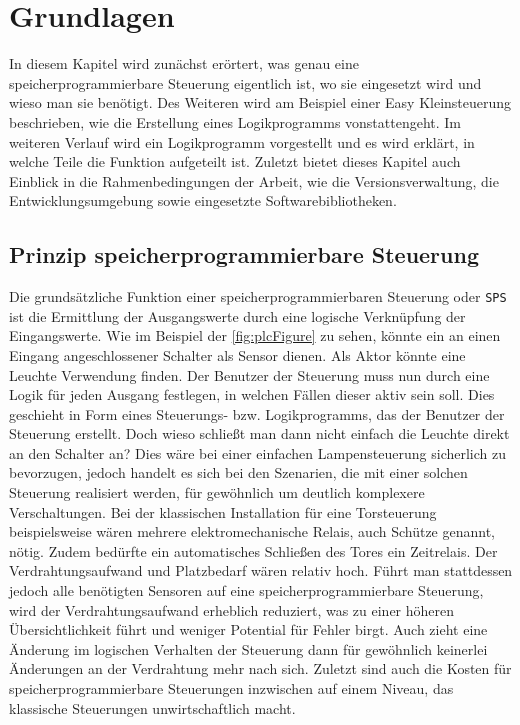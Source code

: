 \section{Grundlagen}\label{kap:grund}
In diesem Kapitel wird zunächst erörtert, was genau eine speicherprogrammierbare Steuerung eigentlich ist, wo sie eingesetzt wird und wieso man sie benötigt. Des Weiteren wird am Beispiel einer Easy Kleinsteuerung beschrieben, wie die Erstellung eines Logikprogramms vonstattengeht. Im weiteren Verlauf wird ein Logikprogramm vorgestellt und es wird erklärt, in welche Teile die Funktion aufgeteilt ist. Zuletzt bietet dieses Kapitel auch Einblick in die Rahmenbedingungen der Arbeit, wie die Versionsverwaltung, die Entwicklungsumgebung sowie eingesetzte Softwarebibliotheken. 
\subsection{Prinzip speicherprogrammierbare Steuerung}
Die grundsätzliche Funktion einer speicherprogrammierbaren Steuerung oder \texttt{SPS} ist die Ermittlung der Ausgangswerte durch eine logische Verknüpfung der Eingangswerte\cite{BOOK:SPS}. Wie im Beispiel der \autoref{fig:plcFigure} zu sehen, könnte ein an einen Eingang angeschlossener Schalter als Sensor dienen. Als Aktor könnte eine Leuchte Verwendung finden. Der Benutzer der Steuerung muss nun durch eine Logik für jeden Ausgang festlegen, in welchen Fällen dieser aktiv sein soll. Dies geschieht in Form eines Steuerungs- bzw. Logikprogramms, das der Benutzer der Steuerung erstellt. Doch wieso schließt man dann nicht einfach die Leuchte direkt an den Schalter an? Dies wäre bei einer einfachen Lampensteuerung sicherlich zu bevorzugen, jedoch handelt es sich bei den Szenarien, die mit einer solchen Steuerung realisiert werden, für gewöhnlich um deutlich komplexere Verschaltungen. Bei der klassischen Installation für eine Torsteuerung beispielsweise wären mehrere elektromechanische Relais, auch Schütze genannt, nötig. Zudem bedürfte ein automatisches Schließen des Tores ein Zeitrelais. Der Verdrahtungsaufwand und Platzbedarf wären relativ hoch. Führt man stattdessen jedoch alle benötigten Sensoren auf eine speicherprogrammierbare Steuerung, wird der Verdrahtungsaufwand erheblich reduziert, was zu einer höheren Übersichtlichkeit führt und weniger Potential für Fehler birgt. Auch zieht eine Änderung im logischen Verhalten der Steuerung dann für gewöhnlich keinerlei Änderungen an der Verdrahtung mehr nach sich. Zuletzt sind auch die Kosten für speicherprogrammierbare Steuerungen inzwischen auf einem Niveau, das klassische Steuerungen unwirtschaftlich macht. 

